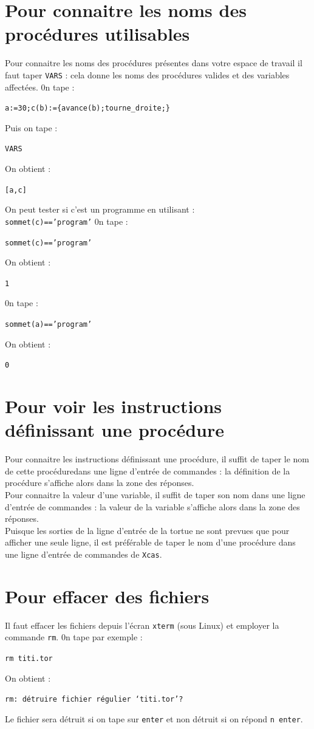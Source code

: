 \documentclass[a4paper,11pt]{book}
\begin{document}
\section{Pour connaitre les noms des proc\'edures utilisables}
Pour connaitre les noms des proc\'edures pr\'esentes dans votre espace de 
travail il faut taper {\tt VARS}  : cela donne les noms des proc\'edures 
valides et des variables affect\'ees.
0n tape :
\begin{center}{\tt a:=30;c(b):=\{avance(b);tourne\_droite;\}}\end{center}
Puis on tape :
\begin{center}{\tt VARS}\end{center}
On obtient :
\begin{center}{\tt [a,c]}\end{center}
On peut tester si c'est un programme en utilisant :\\
{\tt sommet(c)=='program'} 
0n tape :
\begin{center}{\tt sommet(c)=='program'}\end{center}
On obtient :
\begin{center}{\tt 1}\end{center}
0n tape :
\begin{center}{\tt sommet(a)=='program'}\end{center}
On obtient :
\begin{center}{\tt 0}\end{center}


\section{Pour voir les instructions d\'efinissant une proc\'edure}
Pour connaitre les instructions d\'efinissant une proc\'edure, il suffit de 
taper le nom de cette proc\'eduredans une ligne d'entr\'ee de commandes : la 
d\'efinition de la proc\'edure s'affiche alors dans la zone des r\'eponses.\\
Pour connaitre la valeur d'une variable, il suffit de 
taper son nom dans une ligne d'entr\'ee de commandes : la valeur de la 
variable s'affiche alors dans la zone des r\'eponses.\\
Puisque les sorties de la  ligne d'entr\'ee de  la tortue ne sont prevues que
pour afficher une seule ligne, il est pr\'ef\'erable de taper le nom d'une 
proc\'edure dans une ligne d'entr\'ee de commandes de {\tt Xcas}.


\section{Pour effacer des fichiers}
Il faut effacer les fichiers depuis l'\'ecran {\tt xterm} (sous Linux) et 
employer la commande {\tt rm}.
0n tape par exemple :
\begin{center}{\tt rm titi.tor}\end{center}
On obtient :
\begin{center}{\tt rm: d\'etruire fichier r\'egulier `titi.tor'?}\end{center} 
Le fichier sera d\'etruit si on tape sur {\tt enter} et non d\'etruit si on 
r\'epond  {\tt n enter}.
\end{document}
